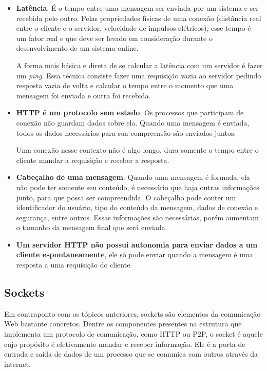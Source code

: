 \documentclass[a4paper,12pt]{article}
\begin{document}
\begin{itemize}
    \item \textbf{Latência}. É o tempo entre uma mensagem ser enviada por um sistema e ser recebida pelo outro. Pelas propriedades físicas de uma conexão (distância real entre o cliente e o servidor, velocidade de impulsos elétricos), esse tempo é um fator real e que deve ser levado em consideração durante o desenvolvimento de um sistema online.

    A forma mais básica e direta de se calcular a latência com um servidor é fazer um \emph{ping}. Essa técnica consiste fazer uma requisição vazia ao servidor pedindo resposta vazia de volta e calcular o tempo entre o momento que uma mensagem foi enviada e outra foi recebida.

    \item \textbf{HTTP é um protocolo sem estado}. Os processos que participam de conexão não guardam dados sobre ela. Quando uma mensagem é enviada, todos os dados necessários para sua compreensão são enviados juntos.

    Uma conexão nesse contexto não é algo longo, dura somente o tempo entre o cliente mandar a requisição e receber a resposta.

    \item \textbf{Cabeçalho de uma mensagem}. Quando uma mensagem é formada, ela não pode ter somente seu conteúdo, é necessário que haja outras informações junto, para que possa ser compreendida. O cabeçalho pode conter um identificador do usuário, tipo do conteúdo da mensagem, dados de conexão e segurança, entre outros. Essas informações são necessárias, porém aumentam o tamanho da mensagem final que será enviada.

    \item \textbf{Um servidor HTTP não possui autonomia para enviar dados a um cliente espontaneamente}, ele só pode enviar quando a mensagem é uma resposta a uma requisição do cliente.
\end{itemize}


\subsection{Sockets}

Em contraponto com os tópicos anteriores, sockets são elementos da comunicação Web bastante concretos. Dentre os componentes presentes na estrutura que implementa um protocolo de comunicação, como HTTP ou P2P, o socket é aquele cujo propósito é efetivamente mandar e receber informação. Ele é a porta de entrada e saída de dados de um processo que se comunica com outros através da internet.
\end{document}
